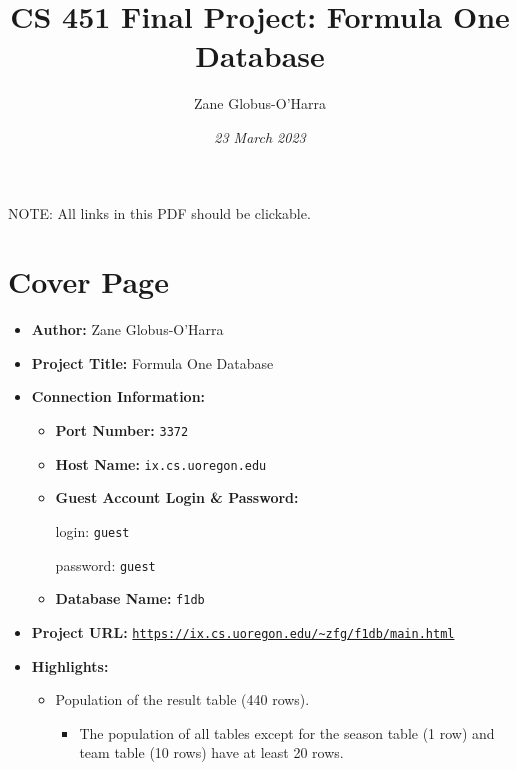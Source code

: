 \documentclass{article} %
\title{CS 451 Final Project: Formula One Database}
\author{Zane Globus-O'Harra}
\date{\textit{23 March 2023}}
\begin{document}
\maketitle
\thispagestyle{empty}

\tableofcontents
\thispagestyle{empty}
\vspace{1.5cm}

\noindent
NOTE: All links in this PDF should be clickable.
\newpage


\section{Cover Page}

\begin{itemize}
    \item \textbf{Author:} Zane Globus-O'Harra
    
    \item \textbf{Project Title:} Formula One Database

    \item \textbf{Connection Information:}
    \begin{itemize}
        \item \textbf{Port Number:} \texttt{3372}

        \item \textbf{Host Name:} \texttt{ix.cs.uoregon.edu}

        \item \textbf{Guest Account Login \& Password:} 

        login: \texttt{guest}

        password: \texttt{guest}

        \item \textbf{Database Name:} \texttt{f1db}

    \end{itemize}

    \item \textbf{Project URL:}
    \href{https://ix.cs.uoregon.edu/~zfg/f1db/main.html}{\texttt{https://ix.cs.uoregon.edu/\~{}zfg/f1db/main.html}}

    \item \textbf{Highlights:}
    \begin{itemize}
        \item Population of the result table (440 rows).
        \begin{itemize}
            \item The population of all tables except for the season
            table (1 row) and team table (10 rows) have at least 20 rows.
        \end{itemize}


\end{itemize}
\end{itemize}
\end{document}
